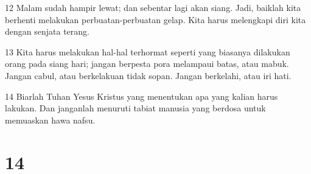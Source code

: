\par 12 Malam sudah hampir lewat; dan sebentar lagi akan siang. Jadi, baiklah kita berhenti melakukan perbuatan-perbuatan gelap. Kita harus melengkapi diri kita dengan senjata terang.
\par 13 Kita harus melakukan hal-hal terhormat seperti yang biasanya dilakukan orang pada siang hari; jangan berpesta pora melampaui batas, atau mabuk. Jangan cabul, atau berkelakuan tidak sopan. Jangan berkelahi, atau iri hati.
\par 14 Biarlah Tuhan Yesus Kristus yang menentukan apa yang kalian harus lakukan. Dan janganlah menuruti tabiat manusia yang berdosa untuk memuaskan hawa nafsu.

\chapter{14}

